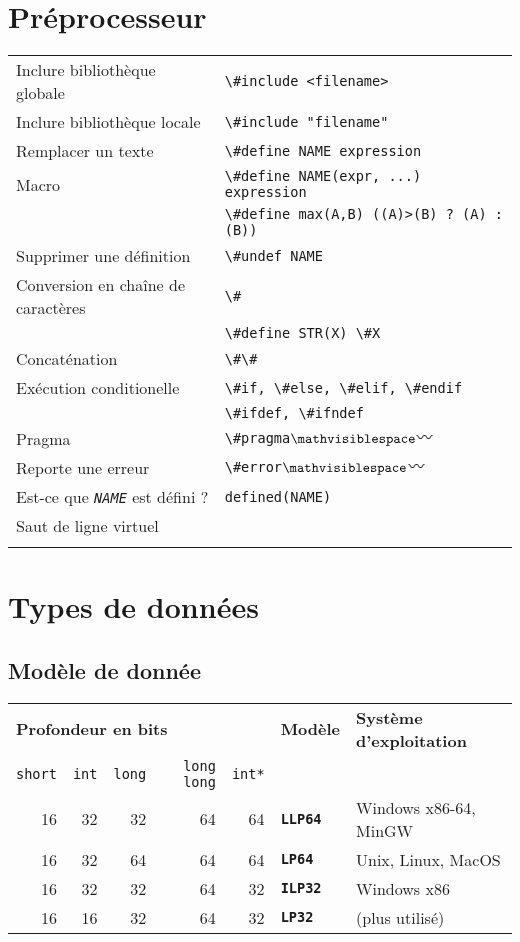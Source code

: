 \documentclass{article}
\newcommand{\NAME}{\emph{NAME}}
\newcommand{\any}{$\hzigzag$ }
\newcommand{\spc}{$\mathvisiblespace$}
\newcommand{\cd}{\lstinline}
\begin{document}
\begin{multicols*}{3}
\section*{Préprocesseur}
\begin{tabularx}{\linewidth}{Xl}
  Inclure bibliothèque globale       & \cd{\#include <filename>} \\
  Inclure bibliothèque locale        & \cd{\#include "filename"} \\
  Remplacer un texte                 & \cd{\#define NAME expression} \\
  Macro                              & \cd{\#define NAME(expr, ...) expression} \\
                                     & \cd{\#define max(A,B) ((A)>(B) ? (A) : (B))} \\
  Supprimer une définition           & \cd{\#undef NAME} \\
  Conversion en chaîne de caractères & \cd{\#} \\
                                     & \cd{\#define STR(X) \#X} \\
  Concaténation                      & \cd{\#\#} \\
  Exécution conditionelle            & \cd{\#if, \#else, \#elif, \#endif} \\
                                     & \cd{\#ifdef, \#ifndef} \\
  Pragma                             & \cd{\#pragma}\tt\spc \any \\
  Reporte une erreur                 & \cd{\#error}\tt\spc \any \\
  Est-ce que \texttt{\NAME} est défini ? & \cd{defined(NAME)} \\
  Saut de ligne virtuel              & \cd{\\}
\end{tabularx}

\section*{Types de données}

\subsection*{Modèle de donnée}
\begin{tabularx}{\linewidth}{r|r|r|r|r|l|X}
  \multicolumn{5}{l|}{\bf Profondeur en bits} & \bf Modèle & \bf Système d'exploitation \\
  \cd {short} & \cd{int} & \cd{long} & \cd{long long} & \cd{int*} & & \\
  \hline
  16 & 32 & 32 & 64 & 64 & \bf \tt LLP64 & Windows x86-64, MinGW \\
  16 & 32 & 64 & 64 & 64 & \bf \tt LP64 & Unix, Linux, MacOS \\
  16 & 32 & 32 & 64 & 32 & \bf \tt ILP32 & Windows x86 \\
  16 & 16 & 32 & 64 & 32 & \bf \tt LP32 & (plus utilisé) \\
\end{tabularx}


\end{multicols*}
\end{document}
